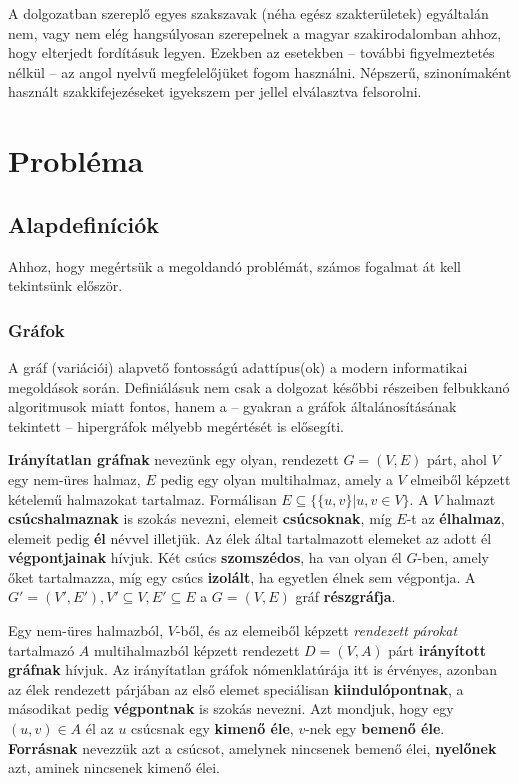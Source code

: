 \begin{note}
A dolgozatban szereplő egyes szakszavak (néha egész szakterületek) egyáltalán nem, vagy nem elég hangsúlyosan szerepelnek a magyar szakirodalomban ahhoz, hogy elterjedt fordításuk legyen. Ezekben az esetekben -- további figyelmeztetés nélkül -- az angol nyelvű megfelelőjüket fogom használni. Népszerű, szinonímaként használt szakkifejezéseket igyekszem per jellel elválasztva felsorolni.
\end{note}

\section{Probléma}

\subsection{Alapdefiníciók}

Ahhoz, hogy megértsük a megoldandó problémát, számos fogalmat át kell tekintsünk először.

\subsubsection{Gráfok}

A gráf (variációi) alapvető fontosságú adattípus(ok) a modern informatikai megoldások során. Definiálásuk nem csak a dolgozat későbbi részeiben felbukkanó algoritmusok miatt fontos, hanem a -- gyakran a gráfok általánosításának tekintett -- hipergráfok mélyebb megértését is elősegíti. 

\begin{definition}
\textbf{Irányítatlan gráfnak} nevezünk egy olyan, rendezett $G=(V,E)$ párt, ahol $V$ egy nem-üres halmaz, $E$ pedig egy olyan multihalmaz, amely a $V$ elmeiből képzett kételemű halmazokat tartalmaz. Formálisan $E \subseteq \{\{u,v\} | u,v \in V\}$. A $V$ halmazt \textbf{csúcshalmaznak} is szokás nevezni, elemeit \textbf{csúcsoknak}, míg $E$-t az \textbf{élhalmaz}, elemeit pedig \textbf{él} névvel illetjük. Az élek által tartalmazott elemeket az adott él \textbf{végpontjainak} hívjuk. Két csúcs \textbf{szomszédos}, ha van olyan él $G$-ben, amely őket tartalmazza, míg egy csúcs \textbf{izolált}, ha egyetlen élnek sem végpontja. A $G'=(V',E'), V' \subseteq V, E' \subseteq E$ a $G=(V,E)$ gráf \textbf{részgráfja}.
\end{definition}

\begin{definition}
Egy nem-üres halmazból, $V$-ből, és az elemeiből képzett \textit{rendezett párokat} tartalmazó $A$ multihalmazból képzett rendezett $D=(V,A)$ párt \textbf{irányított gráfnak} hívjuk. Az irányítatlan gráfok nómenklatúrája itt is érvényes, azonban az élek rendezett párjában az első elemet speciálisan \textbf{kiindulópontnak}, a másodikat pedig \textbf{végpontnak} is szokás nevezni. Azt mondjuk, hogy egy $(u, v) \in A$ él az $u$ csúcsnak egy \textbf{kimenő éle}, $v$-nek egy \textbf{bemenő éle}. \textbf{Forrásnak} nevezzük azt a csúcsot, amelynek nincsenek bemenő élei, \textbf{nyelőnek} azt, aminek nincsenek kimenő élei.
\end{definition}

